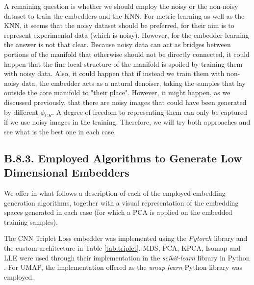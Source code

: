 \documentclass[11pt, a4paper, twoside]{article} %
\begin{document}
A remaining question is whether we should employ the noisy or the non-noisy dataset to train the embedders and the KNN. For metric learning as well as the KNN, it seems that the noisy dataset should be preferred, for their aim is to represent experimental data (which is noisy). However, for the embedder learning the answer is not that clear. Because noisy data can act as bridges between portions of the manifold that otherwise should not be directly connected, it could happen that the fine local structure of the manifold is spoiled by training them with noisy data. Also, it could happen that if instead we train them with non-noisy data, the embedder acts as a natural denoiser, taking the samples that lay outside the core manifold to "their place". However, it might happen, as we discussed previously, that there are noisy images that could have been generated by different $\phi_{CR}$. A degree of freedom to representing them can only be captured if we use noisy images in the training. Therefore, we will try both approaches and see what is the best one in each case. 

\subsection*{B.8.3. Employed Algorithms to Generate Low Dimensional Embedders}
We offer in what follows a description of each of the employed embedding generation algorithms, together with a visual representation of the embedding spaces generated in each case (for which a PCA is applied on the embedded training samples).

The CNN Triplet Loss embedder was implemented using the {\em Pytorch} library \cite{pytorch} and the custom architecture in Table \ref{tab:triplet}. MDS, PCA, KPCA, Isomap and LLE were used through their implementation in the {\em scikit-learn} library in Python \cite{sklearn}. For UMAP, the implementation offered as the {\em umap-learn} \cite{umaplearn} Python library was employed.
\end{document}
